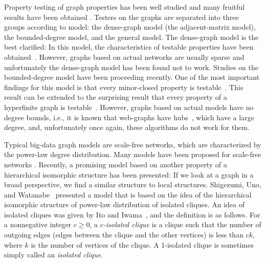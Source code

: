 \documentclass[11pt]{article}
\begin{document}
Property testing of graph properties has been well studied and many fruitful results have been obtained \cite{AlonFNS_Testable_Regularity_SIAMJC09,BSS_MC-testable_STOC08,PropertyTestingLNCS10,GR-STOC97,GGR-JACM98,HKNO_LocalPartition_FOCS09,NS_Testable_SJCOMP13,Levi-Ron_PO_ICALP13}.
Testers on the graphs are separated into three groups according to model: 
the dense-graph model (the adjacent-matrix model), 
the bounded-degree model, 
and 
the general model. 
The dense-graph model is the best clarified: 
In this model, the characteristics of testable properties have been obtained~\cite{AlonFNS_Testable_Regularity_SIAMJC09}.
However, graphs based on actual networks are usually sparse and unfortunately the dense-graph model has been found not to work. 
Studies on the bounded-degree model have been proceeding recently. 
One of the most important findings for this model is that every minor-closed property is testable~\cite{BSS_MC-testable_STOC08}.  
This result can be extended to the surprising result that every property of a hyperfinite graph is testable~\cite{NS_Testable_SJCOMP13}.
However, graphs based on actual models have no degree bounds, i.e., it is known that web-graphs have hubs~\cite{AlbertBarabasi_SF_02,KleinbergLawrence-web-science01}, which have a large degree, and, unfortunately once again, these algorithms do not work for them. 

Typical big-data graph models are scale-free networks, 
which are characterized by the power-law degree distribution.   
Many models have been proposed for scale-free networks \cite{AlbertBarabasi_SF_02,BM_Kronecker_IPL98,Broder_etal-GSinWeb-CN00,CU_SF_Clique_10,Gao_SF_clique_TCS09,KleinbergLawrence-web-science01,StochKronecherG_WAW07,Newman_SF_03,Uno-Watanabe_ScaleFree,WattsStrogatz-Nature98,ZRC_SF_clique_06}. 
Recently, a promising model based on another property of a hierarchical isomorphic structure 
has been presented: 
If we look at a graph in a broad perspective, 
we find a similar structure to local structures. 
Shigezumi, Uno, and Watanabe~\cite{Uno-Watanabe_ScaleFree}
presented a model that is based on the idea of the hierarchical isomorphic 
structure of power-law distribution of isolated cliques.  
An idea of isolated cliques was given by 
Ito and Iwama~\cite{IsoClique_TALG09,IsoClique_ESA05}, 
and the definition is as follows. 
For a nonnegative integer $c \geq 0$, a {\em $c$-isolated clique}
is a clique such that the number of outgoing edges (edges between the clique and the other vertices) 
is less than $ck$, where $k$ is the number of vertices of the clique. 
A 1-isolated clique is sometimes simply called an {\em isolated clique}. 
\end{document}
